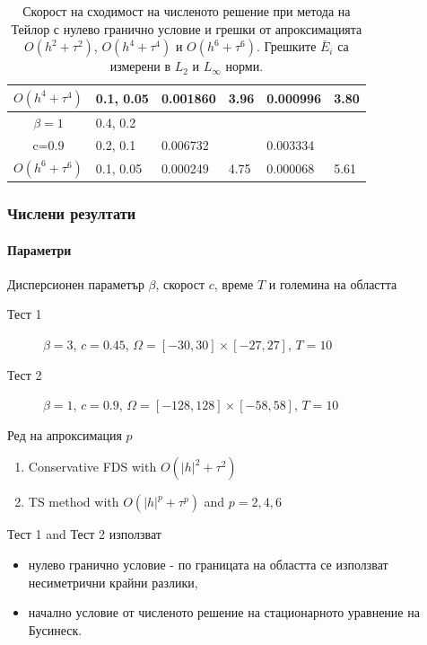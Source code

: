 \documentclass{beamer}
\begin{document}
\begin{frame}
\begin{table}[ht]
{\begin{tabular}{||c|l|ll|ll||}
 $O(h^4+ \tau^4)$ 	&0.1, 0.05   	&0.001860 	& 3.96  & 0.000996  & 3.80  \\
\hline
  $\beta=1$     		&0.4, 0.2   	&            	&          	&                  &      \\
      c=0.9                  &0.2, 0.1   	&0.006732 	&            & 0.003334      &       \\
 $O(h^6+ \tau^6)$ 	&0.1, 0.05 	& 0.000249 	& 4.75 	& 0.000068  & 5.61        \\
\hline
\hline 
		\end{tabular}
		}%
		\caption{Скорост на сходимост на численото решение при метода на Тейлор с нулево гранично условие и грешки от апроксимацията $O(h^{2} + \tau^2 )$, $O(h^{4} + \tau^4 )$ и $O(h^{6} + \tau^6 )$. Грешките $\bar E_i$ са измерени в $L_2$ и $L_\infty$ норми.}
\label{table:A}
\end{table}

\end{frame}


\begin{frame}
\frametitle{Числени резултати}
\framesubtitle{Параметри}

Дисперсионен параметър $\beta$, скорост $c$, време $T$ и големина на областта
\begin{description}
 \item[Тест 1] $\beta = 3$, $c = 0.45$, $\Omega = [-30, 30] \times [-27, 27]$, $T = 10$
 \item[Тест 2] $\beta = 1$, $c = 0.9$, $\Omega = [-128, 128] \times [-58, 58]$, $T = 10$
\end{description}

Ред на апроксимация $p$
\begin{enumerate}
  \item Conservative FDS with $O(|h|^2 + \tau^2)$
  \item TS method with $O(|h|^p + \tau^p)$ and $p = 2, 4, 6$
\end{enumerate}

Тест 1 and Тест 2 използват 
\begin{itemize} 
\item нулево гранично условие - по границата на областта се използват несиметрични крайни разлики,
\item начално условие от численото решение на стационарното уравнение на Бусинеск.
\end{itemize}
\end{frame}
\end{document}
